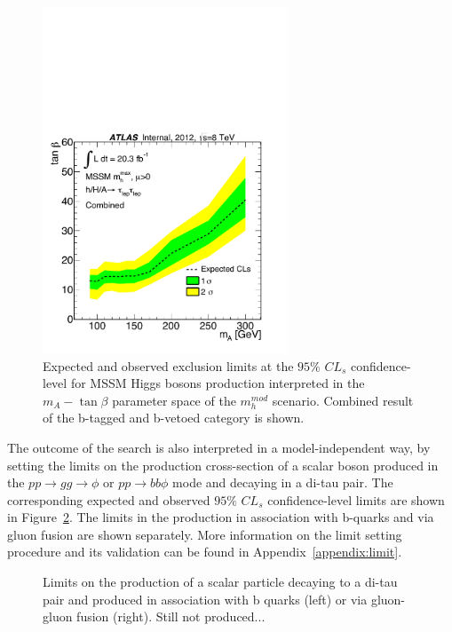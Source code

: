 \begin{figure}[tp]
  \centering
  \includegraphics[width=0.65\textwidth]{figure/limits/Limits_mAtanBeta_Comb.pdf}
  \caption{Expected and observed  exclusion limits at the $95\%$ $CL_s$ confidence-level for MSSM Higgs bosons production 
   interpreted in the  $m_A - \tan\beta$ parameter space of the $m_h^{mod}$ scenario. 
	Combined result of the  b-tagged and b-vetoed category is shown.}
\label{fig:limit_extract_combined}
\end{figure}


The outcome of the search is also interpreted in a model-independent way, by setting the limits
on the production cross-section of a scalar boson produced in the
$pp \rightarrow gg \rightarrow \phi$ or $pp \rightarrow bb\phi$ mode and decaying in a di-tau pair.
The corresponding expected and observed $95\%$ $CL_s$ confidence-level  limits are shown in Figure~\ref{fig:limit_xs}.
The limits in the production in association with b-quarks and via gluon fusion are shown separately.
More information on the limit setting procedure and its validation can be found in Appendix~\ref{appendix:limit}.

\begin{figure}[tp]
  \centering
  \caption{ Limits on the production of a scalar particle decaying to a di-tau pair
    and produced     in association with b quarks (left) or   via gluon-gluon fusion (right). Still not produced...}
\label{fig:limit_xs}
\end{figure}


